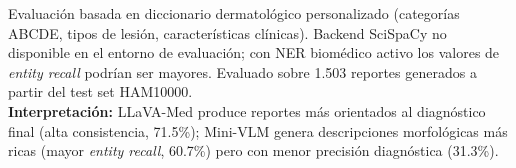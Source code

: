 \begin{table}[htbp]
\centering
\caption{%
  Evaluación de calidad clínica de los reportes generados
  mediante NER (\textit{Named Entity Recognition}) --- Nivel~2.
  \textit{Clinical Entity Recall}: proporción de categorías
  terminológicas dermatológicas mencionadas.
  \textit{Diagnostic Consistency}: porcentaje de reportes donde
  el diagnóstico correcto (o sinónimo) aparece en el texto.
  Estas métricas no requieren reporte de referencia.
}
\label{tab:nivel2_ner}
\vspace{4pt}
\begin{minipage}{0.95\textwidth}
  \footnotesize
  Evaluación basada en diccionario dermatológico personalizado
  (categorías ABCDE, tipos de lesión, características clínicas).
  Backend SciSpaCy no disponible en el entorno de evaluación;
  con NER biomédico activo los valores de \textit{entity recall}
  podrían ser mayores.
  Evaluado sobre 1.503 reportes generados a partir del test set HAM10000.\\[4pt]
  \textbf{Interpretación:} LLaVA-Med produce reportes más orientados
  al diagnóstico final (alta consistencia, 71.5\%);
  Mini-VLM genera descripciones morfológicas más ricas
  (mayor \textit{entity recall}, 60.7\%) pero con menor
  precisión diagnóstica (31.3\%).
\end{minipage}
\end{table}


